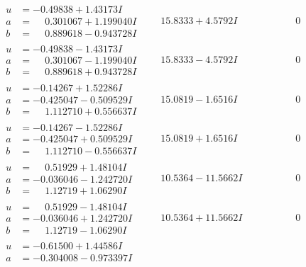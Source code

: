 \documentclass[1p]{elsarticle_modified}
\theoremstyle{definition}
\begin{document}
$$\begin{array}{c|c|c}
 \hline 
\begin{aligned}
u &= -0.49838 + 1.43173 I \\
a &= \phantom{-}0.301067 + 1.199040 I \\
b &= \phantom{-}0.889618 - 0.943728 I\end{aligned}
 & \phantom{-}15.8333 + 4.5792 I & \phantom{-0.000000 } 0 \\ \hline\begin{aligned}
u &= -0.49838 - 1.43173 I \\
a &= \phantom{-}0.301067 - 1.199040 I \\
b &= \phantom{-}0.889618 + 0.943728 I\end{aligned}
 & \phantom{-}15.8333 - 4.5792 I & \phantom{-0.000000 } 0 \\ \hline\begin{aligned}
u &= -0.14267 + 1.52286 I \\
a &= -0.425047 - 0.509529 I \\
b &= \phantom{-}1.112710 + 0.556637 I\end{aligned}
 & \phantom{-}15.0819 - 1.6516 I & \phantom{-0.000000 } 0 \\ \hline\begin{aligned}
u &= -0.14267 - 1.52286 I \\
a &= -0.425047 + 0.509529 I \\
b &= \phantom{-}1.112710 - 0.556637 I\end{aligned}
 & \phantom{-}15.0819 + 1.6516 I & \phantom{-0.000000 } 0 \\ \hline\begin{aligned}
u &= \phantom{-}0.51929 + 1.48104 I \\
a &= -0.036046 - 1.242720 I \\
b &= \phantom{-}1.12719 + 1.06290 I\end{aligned}
 & \phantom{-}10.5364 - 11.5662 I & \phantom{-0.000000 } 0 \\ \hline\begin{aligned}
u &= \phantom{-}0.51929 - 1.48104 I \\
a &= -0.036046 + 1.242720 I \\
b &= \phantom{-}1.12719 - 1.06290 I\end{aligned}
 & \phantom{-}10.5364 + 11.5662 I & \phantom{-0.000000 } 0 \\ \hline\begin{aligned}
u &= -0.61500 + 1.44586 I \\
a &= -0.304008 - 0.973397 I \\

\end{aligned}
\end{array}$$
\end{document}

